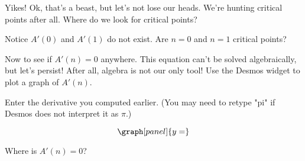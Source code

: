 \documentclass[handout,nooutcomes]{ximera}
\begin{document}
\bigskip

\begin{problem}
\hspace{2cm}Yikes! Ok, that's a beast, but let's not lose our heads. We're hunting critical points after all. Where do we look for critical points?
\begin{selectAll}
\end{selectAll}
\end{problem}

\bigskip

\begin{problem}
Notice $A'(0)$ and $A'(1)$ do not exist. Are $n=0$ and $n=1$ critical points?
\begin{multipleChoice}
\end{multipleChoice}
\end{problem}

\bigskip

\hspace{2cm}Now to see if $A'(n)=0$ anywhere. This equation can't be solved algebraically, but let's persist! After all, algebra is not our only tool! Use the Desmos widget to plot a graph of $A'(n)$.

Enter the derivative you computed earlier. (You may need to retype "pi" if Desmos does not interpret it as $\pi$.)

\[
\graph[panel]{y=}
\]

\begin{problem}
Where is $A'(n)=0$?

\begin{multipleChoice}
\end{multipleChoice}
\end{problem}
\end{document}
